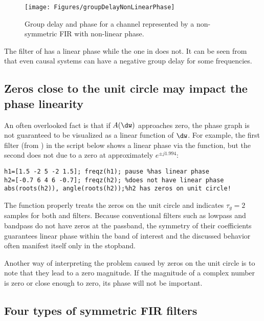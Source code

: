 \begin{figure}[htbp]
\centering
\texttt{[image: Figures/groupDelayNonLinearPhase]}
\caption{Group delay and phase for a channel represented by a non-symmetric FIR  with non-linear phase.\label{fig:groupDelayNonLinearPhase}}
\end{figure}

The filter of  has a linear phase while the one in  does not.
It can be seen from  that even causal systems can have a negative group delay for some frequencies.

\subsection{Zeros close to the unit circle may impact the phase linearity}
\label{sec:symmetricFIRnonlinearPhase}

An often overlooked fact is that
if $A(\dw)$ approaches zero, the phase graph is not guaranteed to be visualized as a linear function of $\dw$. For example, the first filter (from ) in the script below shows a  linear phase via the  function, but the second does not due to a zero at approximately $e^{\pm j 1.994}$:
\begin{lstlisting}
h1=[1.5 -2 5 -2 1.5]; freqz(h1); pause %has linear phase
h2=[-0.7 6 4 6 -0.7]; freqz(h2); %does not have linear phase
abs(roots(h2)), angle(roots(h2));%h2 has zeros on unit circle!
\end{lstlisting}
The function  properly treats the zeros on the unit circle and indicates $\tau_g=2$ samples for both  and  filters.
Because conventional filters such as lowpass and bandpass do not have zeros at the passband, the symmetry of their coefficients guarantees linear phase within the band of interest and the discussed behavior often manifest itself only in the stopband.

Another way of interpreting the problem caused by zeros on the unit circle is to note that
they lead to a zero magnitude. If the magnitude of a complex number is zero or close 
enough to zero, its phase will not be important.

\subsection{Four types of symmetric FIR filters}

